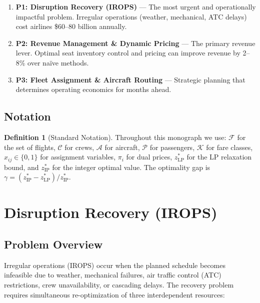 \documentclass[11pt,a4paper]{book}
\theoremstyle{definition}
\newtheorem{definition}[theorem]{Definition}
\begin{document}
\begin{enumerate}
  \item \textbf{P1: Disruption Recovery (IROPS)} --- The most urgent and
    operationally impactful problem. Irregular operations (weather, mechanical,
    ATC delays) cost airlines \$60--80 billion annually.
  \item \textbf{P2: Revenue Management \& Dynamic Pricing} --- The primary
    revenue lever. Optimal seat inventory control and pricing can improve
    revenue by 2--8\% over na\"ive methods.
  \item \textbf{P3: Fleet Assignment \& Aircraft Routing} --- Strategic
    planning that determines operating economics for months ahead.
\end{enumerate}

\section{Notation}

\begin{definition}[Standard Notation]
Throughout this monograph we use:
$\mathcal{F}$ for the set of flights,
$\mathcal{C}$ for crews,
$\mathcal{A}$ for aircraft,
$\mathcal{P}$ for passengers,
$\mathcal{K}$ for fare classes,
$x_{ij} \in \{0,1\}$ for assignment variables,
$\pi_i$ for dual prices,
$z^*_{\text{LP}}$ for the LP relaxation bound, and
$z^*_{\text{IP}}$ for the integer optimal value.
The optimality gap is $\gamma = (z^*_{\text{IP}} - z^*_{\text{LP}}) / z^*_{\text{IP}}$.
\end{definition}


\chapter{Disruption Recovery (IROPS)}

\section{Problem Overview}

Irregular operations (IROPS) occur when the planned schedule becomes
infeasible due to weather, mechanical failures, air traffic control (ATC)
restrictions, crew unavailability, or cascading delays. The recovery problem
requires simultaneous re-optimization of three interdependent resources:
\end{document}
